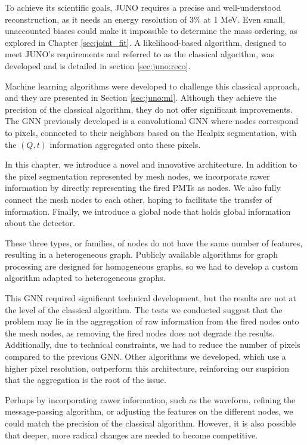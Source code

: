 \documentclass[../main.tex]{subfiles}
\begin{document}
To achieve its scientific goals, JUNO requires a precise and well-understood reconstruction, as it needs an energy resolution of $3\%$ at 1 MeV. Even small, unaccounted biases could make it impossible to determine the mass ordering, as explored in Chapter \ref{sec:joint_fit}. A likelihood-based algorithm, designed to meet JUNO’s requirements and referred to as the classical algorithm, was developed and is detailed in section \ref{sec:juno:reco}.

Machine learning algorithms were developed to challenge this classical approach, and they are presented in Section \ref{sec:juno:ml}. Although they achieve the precision of the classical algorithm, they do not offer significant improvements. The GNN previously developed is a convolutional GNN where nodes correspond to pixels, connected to their neighbors based on the Healpix \cite{gorski_healpix_2005} segmentation, with the $(Q, t)$ information aggregated onto these pixels.

In this chapter, we introduce a novel and innovative architecture. In addition to the pixel segmentation represented by mesh nodes, we incorporate rawer information by directly representing the fired PMTs as nodes. We also fully connect the mesh nodes to each other, hoping to facilitate the transfer of information. Finally, we introduce a global node that holds global information about the detector.

These three types, or families, of nodes do not have the same number of features, resulting in a heterogeneous graph. Publicly available algorithms for graph processing are designed for homogeneous graphs, so we had to develop a custom algorithm adapted to heterogeneous graphs.

This GNN required significant technical development, but the results are not at the level of the classical algorithm. The tests we conducted suggest that the problem may lie in the aggregation of raw information from the fired nodes onto the mesh nodes, as removing the fired nodes does not degrade the results. Additionally, due to technical constraints, we had to reduce the number of pixels compared to the previous GNN. Other algorithms we developed, which use a higher pixel resolution, outperform this architecture, reinforcing our suspicion that the aggregation is the root of the issue.

Perhaps by incorporating rawer information, such as the waveform, refining the message-passing algorithm, or adjusting the features on the different nodes, we could match the precision of the classical algorithm. However, it is also possible that deeper, more radical changes are needed to become competitive.
\end{document}
